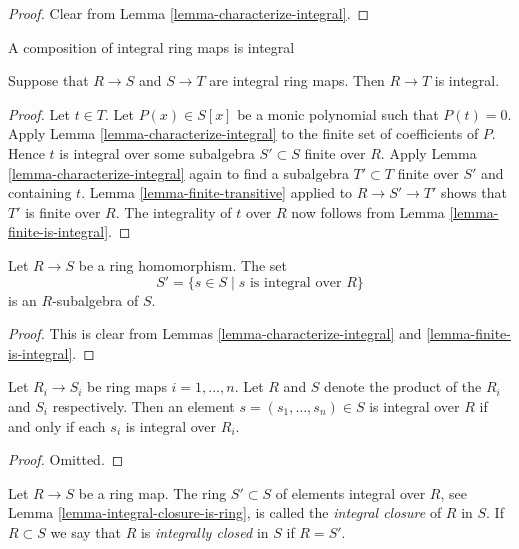 \begin{proof}
Clear from Lemma \ref{lemma-characterize-integral}.
\end{proof}

\begin{lemma}
\label{lemma-integral-transitive}
\begin{slogan}
A composition of integral ring maps is integral
\end{slogan}
Suppose that $R \to S$ and $S \to T$ are integral
ring maps. Then $R \to T$ is integral.
\end{lemma}

\begin{proof}
Let $t \in T$. Let $P(x) \in S[x]$ be a
monic polynomial such that $P(t) = 0$.
Apply Lemma \ref{lemma-characterize-integral}
to the finite set of coefficients of $P$.
Hence $t$ is integral over some subalgebra
$S' \subset S$ finite over $R$. Apply Lemma
\ref{lemma-characterize-integral} again to find
a subalgebra $T' \subset T$ finite over $S'$ and
containing $t$. Lemma \ref{lemma-finite-transitive}
applied to $R \to S' \to T'$ shows that $T'$ is finite
over $R$. The integrality of $t$ over $R$
now follows from Lemma \ref{lemma-finite-is-integral}.
\end{proof}

\begin{lemma}
\label{lemma-integral-closure-is-ring}
Let $R \to S$ be a ring homomorphism.
The set
$$
S' = \{s \in S \mid s\text{ is integral over }R\}
$$
is an $R$-subalgebra of $S$.
\end{lemma}

\begin{proof}
This is clear from Lemmas \ref{lemma-characterize-integral}
and \ref{lemma-finite-is-integral}.
\end{proof}

\begin{lemma}
\label{lemma-finite-product-integral}
Let $R_i\to S_i$ be ring maps $i = 1, \ldots, n$.
Let $R$ and $S$ denote the product of the $R_i$ and $S_i$ respectively.
Then an element $s = (s_1, \ldots, s_n) \in S$ is integral over $R$
if and only if each $s_i$ is integral over $R_i$.
\end{lemma}

\begin{proof}
Omitted.
\end{proof}

\begin{definition}
\label{definition-integral-closure}
Let $R \to S$ be a ring map.
The ring $S' \subset S$ of elements integral over
$R$, see Lemma \ref{lemma-integral-closure-is-ring},
is called the {\it integral closure} of $R$
in $S$. If $R \subset S$ we say that $R$ is
{\it integrally closed} in $S$ if $R = S'$.
\end{definition}

